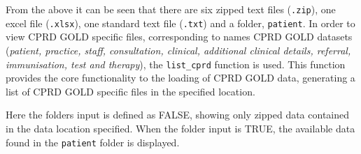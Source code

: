\documentclass[
]{article}
\newenvironment{Shaded}{\begin{snugshade}}{\end{snugshade}}
\newcommand{\AttributeTok}[1]{\textcolor[rgb]{0.77,0.63,0.00}{#1}}
\newcommand{\CommentTok}[1]{\textcolor[rgb]{0.56,0.35,0.01}{\textit{#1}}}
\newcommand{\FunctionTok}[1]{\textcolor[rgb]{0.00,0.00,0.00}{#1}}
\newcommand{\NormalTok}[1]{#1}
\begin{document}
From the above it can be seen that there are six zipped text files
(\texttt{.zip}), one excel file (\texttt{.xlsx}), one standard text file
(\texttt{.txt}) and a folder, \texttt{patient}. In order to view CPRD
GOLD specific files, corresponding to names CPRD GOLD datasets
(\emph{patient, practice, staff, consultation, clinical, additional
clinical details, referral, immunisation, test and therapy}), the
\texttt{list\_cprd} function is used. This function provides the core
functionality to the loading of CPRD GOLD data, generating a list of
CPRD GOLD specific files in the specified location.

\begin{Shaded}
\end{Shaded}

Here the folders input is defined as FALSE, showing only zipped data
contained in the data location specified. When the folder input is TRUE,
the available data found in the \texttt{patient} folder is displayed.
\end{document}
